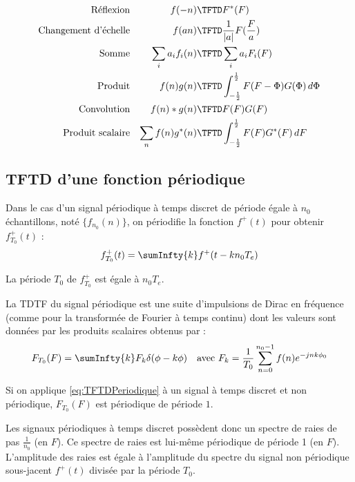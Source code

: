                 \begin{align*}
                    \mbox{Réflexion} && f(-n) &\TFTD F^*(F)\\
                    \mbox{Changement d'échelle} && f(an) &\TFTD \frac{1}{|a|}F(\frac{F}{a})\\
                    \mbox{Somme} && \sum_i a_if_i(n) &\TFTD \sum_i a_iF_i(F)\\
                    \mbox{Produit} && f(n)g(n) &\TFTD \int_{-\frac{1}{2}}^{\frac{1}{2}} F(F-\Phi)G(\Phi)\,d\Phi\\
                    \mbox{Convolution} && f(n)*g(n) &\TFTD F(F)G(F)\\
                    \mbox{Produit scalaire} && \sum_n f(n)g^*(n) &\TFTD \int_{-\frac{1}{2}}^{\frac{1}{2}} F(F)G^*(F)\,dF
                \end{align*}

        \subsection{TFTD d'une fonction périodique}
                Dans le cas d'un signal périodique à temps discret de période égale à $n_0$ échantillons, noté $\{f_{n_0}(n)\}$, on périodifie la fonction $f^+(t)$ pour obtenir $f_{T_0}^+(t)$ :
                $$
                    f_{T_0}^+(t) = \sumInfty{k} f^+(t - kn_0T_e)
                $$

                La période $T_0$ de $f_{T_0}^+$ est égale à $n_0 T_e$.

                La TDTF du signal périodique est une suite d'impulsions de Dirac en fréquence (comme pour la transformée de Fourier à temps continu) dont les valeurs sont données par les produits scalaires obtenus par :
                \begin{align}
                    & F_{T_0}(F) = \sumInfty{k} F_k\delta(\phi - k\phi) & \mbox{avec } F_k = \frac{1}{T_0} \sum_{n=0}^{n_0-1} f(n) e^{-jnk\phi_0}
                    \label{eq:TFTDPeriodique}
                \end{align}

                \begin{remarque}
                    Si on applique \eqref{eq:TFTDPeriodique} à un signal à temps discret et non périodique, $F_{T_0}(F)$ est périodique de période $1$.
                \end{remarque}

                Les signaux périodiques à temps discret possèdent donc un spectre de raies de pas $\frac{1}{n_0}$ (en $F$). Ce spectre de raies est lui-même périodique de période 1 (en $F$). L'amplitude des raies est égale à l'amplitude du spectre du signal non périodique sous-jacent $f^+(t)$ divisée par la période $T_0$.


